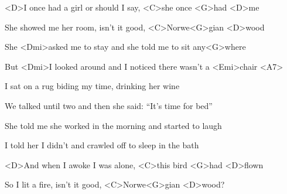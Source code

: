 
\zs
<D>I once had a girl or should I say, <C>she once <G>had <D>me

She showed me her room, isn't it good, <C>Norwe<G>gian <D>wood

She <Dmi>asked me to stay and she told me to sit any<G>where

But <Dmi>I looked around and I noticed there wasn't a <Emi>chair <A7>
\ks

\zs
I sat on a rug biding my time, drinking her wine

We talked until two and then she said: ``It's time for bed''

She told me she worked in the morning and started to laugh

I told her I didn't and crawled off to sleep in the bath
\ks

\zr
<D>And when I awoke I was alone, <C>this bird <G>had <D>flown

So I lit a fire, isn't it good, <C>Norwe<G>gian <D>wood?
\kr

\kp
